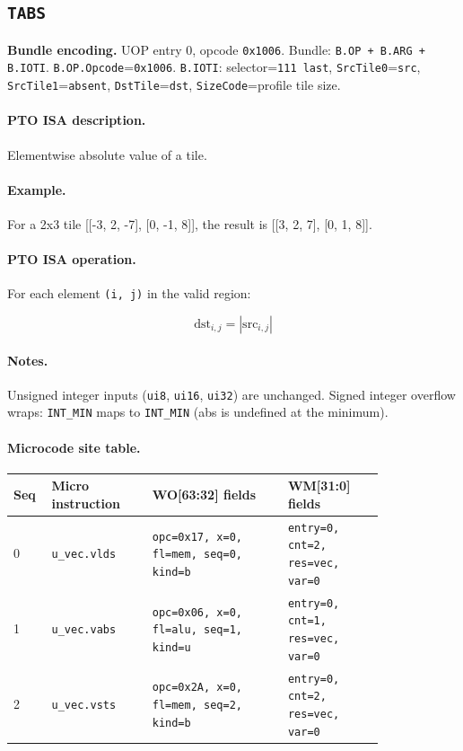 \subsection{\texttt{TABS}}
\noindent\textbf{Bundle encoding.} UOP entry 0, opcode \texttt{0x1006}. Bundle: \texttt{B.OP + B.ARG + B.IOTI}. \texttt{B.OP.Opcode}=\texttt{0x1006}. \texttt{B.IOTI}: selector=\texttt{111 last}, \texttt{SrcTile0}=\texttt{src}, \texttt{SrcTile1}=\texttt{absent}, \texttt{DstTile}=\texttt{dst}, \texttt{SizeCode}=profile tile size.\par\smallskip
{\small
\paragraph{PTO ISA description.}
Elementwise absolute value of a tile.
\paragraph{Example.}
For a 2x3 tile [[-3, 2, -7], [0, -1, 8]], the result is [[3, 2, 7], [0, 1, 8]].
\par\smallskip
\paragraph{PTO ISA operation.}
For each element \texttt{(i, j)} in the valid region:

\[
\mathrm{dst}_{i,j} = \left|\mathrm{src}_{i,j}\right|
\]
}\par\smallskip
\paragraph{Notes.}
Unsigned integer inputs (\texttt{ui8}, \texttt{ui16}, \texttt{ui32}) are unchanged. Signed integer overflow wraps: \texttt{INT\_MIN} maps to \texttt{INT\_MIN} (abs is undefined at the minimum).
\paragraph{Microcode site table.}
{\scriptsize
\begin{longtable}{@{}R{0.055\linewidth}L{0.23\linewidth}L{0.31\linewidth}L{0.22\linewidth}@{}}
\toprule
Seq & Micro instruction & WO[63:32] fields & WM[31:0] fields \\
 & \texttt{u\_vec.vlds} & \texttt{opc=0x17, x=0, fl=mem, seq=0, kind=b} & \texttt{entry=0, cnt=2, res=vec, var=0} \\
1 & \texttt{u\_vec.vabs} & \texttt{opc=0x06, x=0, fl=alu, seq=1, kind=u} & \texttt{entry=0, cnt=1, res=vec, var=0} \\
2 & \texttt{u\_vec.vsts} & \texttt{opc=0x2A, x=0, fl=mem, seq=2, kind=b} & \texttt{entry=0, cnt=2, res=vec, var=0} \\
\bottomrule
\end{longtable}
}
